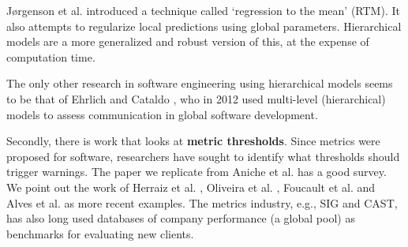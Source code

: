 \documentclass[sigconf,natbib=false]{acmart}
\begin{document}

Jørgenson et al. \cite{JORGENSEN2003} introduced a technique called `regression to the mean' (RTM). It also attempts to regularize local predictions using global parameters. 
Hierarchical models are a more generalized and robust version of this, at the expense of computation time.

The only other research in software engineering using hierarchical models seems to be that of Ehrlich and Cataldo \cite{Ehrlich:2012}, who in 2012 used multi-level (hierarchical) models to assess communication in global software development.%

Secondly, there is work that looks at \textbf{metric thresholds}. Since metrics were proposed for software, researchers have sought to identify what thresholds should trigger warnings. The paper we replicate from Aniche et al. \cite{Aniche2016} has a good survey. We point out the work of Herraiz et al. \cite{Herraiz2012}, Oliveira et al. \cite{oliveira14}, Foucault et al. \cite{Foucault2014} and Alves et al. \cite{alves2010deriving} as more recent examples. The metrics industry, e.g., SIG and CAST, has also long used databases of company performance (a global pool) as benchmarks for evaluating new clients.


\end{document}
